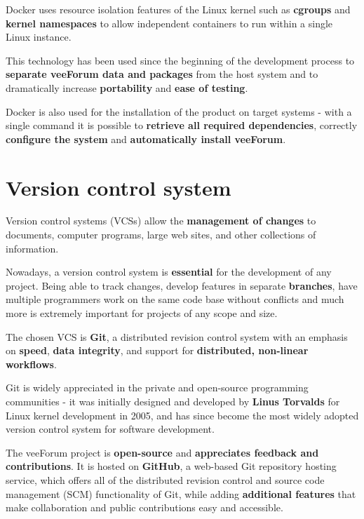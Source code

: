 \documentclass[12pt]{report}
\newcommand{\+}{\discretionary{\mbox{\scriptsize$\hookleftarrow$}}{}{}}
\renewcommand\emph{\textbf}
\begin{document}
                Docker uses resource isolation features of the Linux kernel such as \emph{cgroups} and \emph{kernel namespaces} to allow independent containers to run within a single Linux instance.

                This technology has been used since the beginning of the development process to \emph{separate veeForum data and packages} from the host system and to dramatically increase \emph{portability} and \emph{ease of testing}.

                Docker is also used for the installation of the product on target systems - with a single command it is possible to \emph{retrieve all required dependencies}, correctly \emph{configure the system} and \emph{automatically install veeForum}.

            \section{Version control system}
                Version control systems (VCSs) allow the \emph{management of changes} to documents, computer programs, large web sites, and other collections of information.

                Nowadays, a version control system is \emph{essential} for the development of any project.
                Being able to track changes, develop features in separate \emph{branches}, have multiple programmers work on the same code base without conflicts and much more is extremely important for projects of any scope and size.

                The chosen VCS is \emph{Git}, a distributed revision control system with an emphasis on \emph{speed}, \emph{data integrity}, and support for \emph{distributed, non-linear workflows}.

                Git is widely appreciated in the private and open-source programming communities - it was initially designed and developed by \emph{Linus Torvalds} for Linux kernel development in 2005, and has since become the most widely adopted version control system for software development.

                The veeForum project is \emph{open-source} and \emph{appreciates feedback and contributions}. It is hosted on \emph{GitHub}, a web-based Git repository hosting service, which offers all of the distributed revision control and source code management (SCM) functionality of Git, while adding \emph{additional features} that make collaboration and public contributions easy and accessible.
\end{document}
